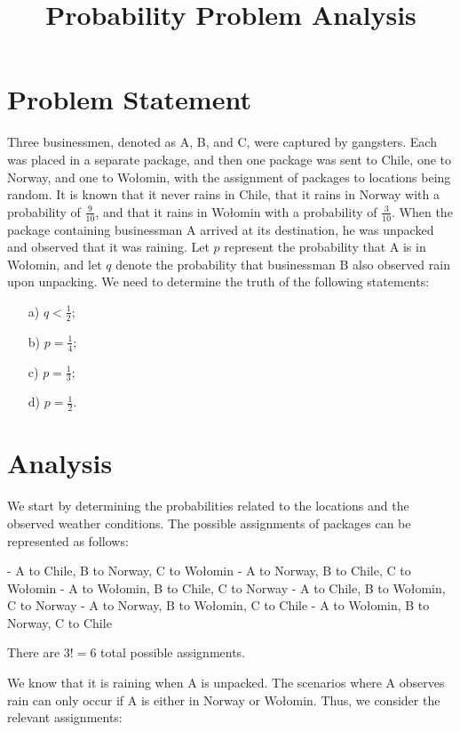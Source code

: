 \documentclass{article}
\title{Probability Problem Analysis}
\author{}
\date{}
\begin{document}
\maketitle

\section{Problem Statement}
Three businessmen, denoted as A, B, and C, were captured by gangsters. Each was placed in a separate package, and then one package was sent to Chile, one to Norway, and one to Wołomin, with the assignment of packages to locations being random. It is known that it never rains in Chile, that it rains in Norway with a probability of \( \frac{9}{10} \), and that it rains in Wołomin with a probability of \( \frac{3}{10} \). When the package containing businessman A arrived at its destination, he was unpacked and observed that it was raining. Let \( p \) represent the probability that A is in Wołomin, and let \( q \) denote the probability that businessman B also observed rain upon unpacking. We need to determine the truth of the following statements:

\begin{enumerate}
    \item[a)] \( q < \frac{1}{2} \);
    \item[b)] \( p = \frac{1}{4} \);
    \item[c)] \( p = \frac{1}{3} \);
    \item[d)] \( p = \frac{1}{2} \).
\end{enumerate}

\section{Analysis}
We start by determining the probabilities related to the locations and the observed weather conditions. The possible assignments of packages can be represented as follows:

- A to Chile, B to Norway, C to Wołomin
- A to Norway, B to Chile, C to Wołomin
- A to Wołomin, B to Chile, C to Norway
- A to Chile, B to Wołomin, C to Norway
- A to Norway, B to Wołomin, C to Chile
- A to Wołomin, B to Norway, C to Chile

There are \( 3! = 6 \) total possible assignments.

We know that it is raining when A is unpacked. The scenarios where A observes rain can only occur if A is either in Norway or Wołomin. Thus, we consider the relevant assignments:
\end{document}
